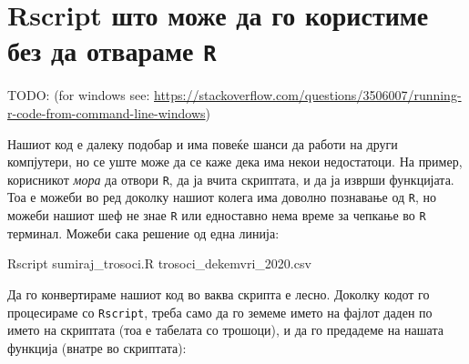 \documentclass[
]{book}
\newenvironment{Shaded}{\begin{snugshade}}{\end{snugshade}}
\newcommand{\ExtensionTok}[1]{#1}
\newcommand{\NormalTok}[1]{#1}
\begin{document}
\hypertarget{rscript-ux448ux442ux43e-ux43cux43eux436ux435-ux434ux430-ux433ux43e-ux43aux43eux440ux438ux441ux442ux438ux43cux435-ux431ux435ux437-ux434ux430-ux43eux442ux432ux430ux440ux430ux43cux435-r}{%
\section{\texorpdfstring{Rscript што може да го користиме без да отвараме \texttt{R}}{Rscript што може да го користиме без да отвараме R}}\label{rscript-ux448ux442ux43e-ux43cux43eux436ux435-ux434ux430-ux433ux43e-ux43aux43eux440ux438ux441ux442ux438ux43cux435-ux431ux435ux437-ux434ux430-ux43eux442ux432ux430ux440ux430ux43cux435-r}}

TODO:
(for windows see: \url{https://stackoverflow.com/questions/3506007/running-r-code-from-command-line-windows})

Нашиот код е далеку подобар и има повеќе шанси да работи на други компјутери, но се уште може да се каже дека има некои недостатоци. На пример, корисникот \emph{мора} да отвори \texttt{R}, да ја вчита скриптата, и да ја изврши функцијата. Тоа е можеби во ред доколку нашиот колега има доволно познавање од \texttt{R}, но можеби нашиот шеф не знае \texttt{R} или едноставно нема време за чепкање во \texttt{R} терминал. Можеби сака решение од една линија:

\begin{Shaded}
\begin{Highlighting}[]
\ExtensionTok{Rscript}\NormalTok{ sumiraj_trosoci.R trosoci_dekemvri_2020.csv}
\end{Highlighting}
\end{Shaded}

Да го конвертираме нашиот код во ваква скрипта е лесно. Доколку кодот го процесираме со \texttt{Rscript}, треба само да го земеме името на фајлот даден по името на скриптата (тоа е табелата со трошоци), и да го предадеме на нашата функција (внатре во скриптата):
\end{document}
